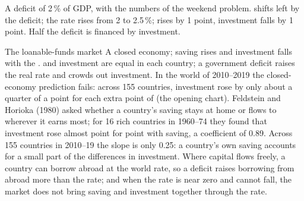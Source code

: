 \begin{omfigure}

{\small A deficit of 2\,\% of GDP, with the numbers of the weekend problem.  shifts left by the deficit; the rate rises from 2 to 2.5\,\%;  rises
by 1 point, investment falls by 1 point. Half the deficit is financed by  investment.}
\end{omfigure}

\begin{model}{The loanable-funds market}
\assumes A closed economy; saving rises and investment falls with the .
\predicts {} and investment are equal in each country; a government deficit raises the real rate and crowds out investment.
\tested In the world of 2010--2019 the closed-economy prediction fails: across 155 countries, investment rose by only about a quarter of a point for each extra point of
   (the opening chart). Feldstein and Horioka (1980) asked whether a country's saving stays at home or flows to wherever it earns most; for 16 rich countries
  in 1960--74 they found that investment rose almost point for point with saving, a coefficient of 0.89. Across 155 countries in 2010--19 the slope
  is only 0.25: a country's own saving accounts for a small part of the differences in investment.
\breaks Where capital flows freely, a country can borrow abroad at the world rate, so a deficit raises borrowing from abroad more than the rate; and when the rate is near
  zero and cannot fall, the market does not bring saving and investment together through the rate.
\end{model}

